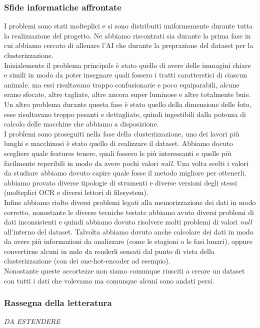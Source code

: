 \documentclass[12pt,a4paper,twoside]{article}
\begin{document}
\subsubsection*{Sfide informatiche affrontate}
I problemi sono stati molteplici e si sono distribuiti uniformemente durante tutta la realizzazione del 
progetto. Ne abbiamo riscontrati sia durante la prima fase in cui abbiamo cercato di allenare l'AI che 
durante la preprazione del dataset per la clusterizzazione.\\
Inizialemente il problema principale è stato quello di avere delle immagini chiare e simili in modo da 
poter insegnare quali fossero i tratti caratterstici di ciascun animale, ma essi risultavano troppo 
confusionarie e poco equiparabili, alcune erano sfocate, altre tagliate, altre ancora super luminose e 
altre totalmente buie. Un altro problema durante questa fase è stato quello della dimensione delle foto, 
esse risultavano troppo pesanti e dettagliate, quindi ingestibili dalla potenza di calcolo delle macchine 
che abbiamo a disposizione.\\
I problemi sono proseguiti nella fase della clusterizzazione, uno dei lavori più lunghi e macchinosi è 
stato quello di realizzare il dataset. Abbiamo docuto scegliere quale features tenere, quali fossero le 
più interessanti e quelle più facilmente reperibili in modo da avere pochi valori \textit{null}. Una volta 
scelti i valori da studiare abbiamo dovuto capire quale fosse il metodo migliore per ottenerli, abbiamo 
provato diverse tipologie di strumenti e diverse versioni degli stessi (molteplici OCR e diversi lettori 
di filesystem).\\
Infine abbiamo riolto diversi problemi legati alla memorizzazione dei dati in modo corretto, nonostante 
le diverse tecniche testate abbiamo avuto diversi problemi di dati inconsistenti e quindi abbiamo dovuto 
risolvere molti problemi di valori \textit{null} all'interno del dataset. Talvolta abbiamo dovuto anche 
calcolare dei dati in modo da avere più informazioni da analizzare (come le stagioni o le fasi lunari), 
oppure convertirne alcuni in mdo da renderli sensati dal punto di vista della clusterizzazione (con dei 
one-hot-encoder ad esempio).\\
Nonostante queste accortezze non siamo comunque riusciti a creare un dataset con tutti i dati che volevamo 
ma comunque alcuni sono andati persi.
\subsubsection*{Rassegna della letteratura}
\textit{DA ESTENDERE}
\end{document}
